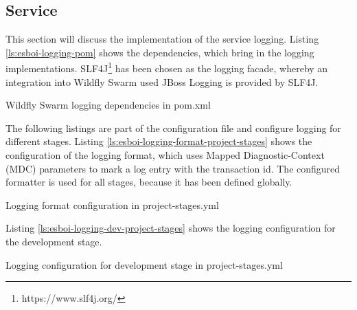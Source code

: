 \subsection{Service}
\label{sec:esbi-logging-service}
This section will discuss the implementation of the service logging. Listing \vref{ls:esboi-logging-pom} shows the dependencies, which bring in the logging implementations. SLF4J\footnote{https://www.slf4j.org/} has been chosen as the logging facade, whereby an integration into Wildfly Swarm used JBoss Logging is provided by SLF4J.

\begin{listing}[h]
	\caption{Wildfly Swarm logging dependencies in pom.xml}
	\label{ls:esboi-logging-pom}
\end{listing}

The following listings are part of the  configuration file and configure logging for different stages. Listing \vref{ls:esboi-logging-format-project-stages} shows the configuration of the logging format, which uses Mapped Diagnostic-Context (MDC) parameters to mark a log entry with the transaction id. The configured formatter is used for all stages, because it has been defined globally.

\begin{listing}[h]
	\caption{Logging format configuration in project-stages.yml}
	\label{ls:esboi-logging-format-project-stages}
\end{listing}

Listing \vref{ls:esboi-logging-dev-project-stages} shows the logging configuration for the development stage.

\begin{listing}[h]
	\caption{Logging configuration for development stage in project-stages.yml}
	\label{ls:esboi-logging-dev-project-stages}
\end{listing}

